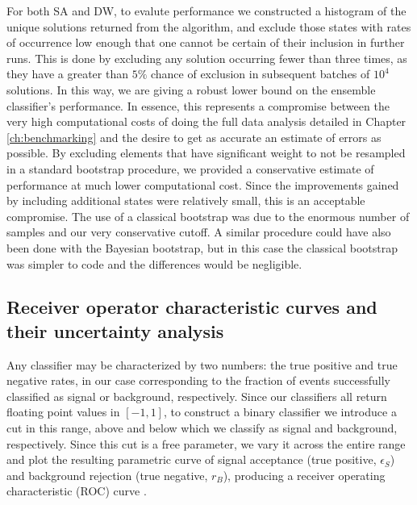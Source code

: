 For both SA and DW, to evalute performance we constructed a histogram of the unique solutions returned from the algorithm, and exclude those states with rates of occurrence low enough that one cannot be certain of their inclusion in further runs. This is done by excluding any solution occurring fewer than three times, as they have a greater than $5\%$ chance of exclusion in subsequent batches of $10^4$ solutions. In this way, we are giving a robust lower bound on the ensemble classifier's performance. In essence, this  represents a compromise between the very high computational costs of doing the full data analysis detailed in Chapter \ref{ch:benchmarking} and the desire to get as accurate an estimate of errors as possible. By excluding elements that have significant weight to not be resampled in a standard bootstrap procedure, we provided a conservative estimate of performance at much lower computational cost. Since the improvements gained by including additional states were relatively small, this is an acceptable compromise. The use of a classical bootstrap was due to the enormous number of samples and our very conservative cutoff. A similar procedure could have also been done with the Bayesian bootstrap, but in this case the classical bootstrap was simpler to code and the differences would be negligible.

\subsection{Receiver operator characteristic curves and their uncertainty analysis}
Any classifier may be characterized by two numbers: the true positive and true negative rates, in our case corresponding to the fraction of events successfully classified as signal or background, respectively. Since our classifiers all return floating point values in $[-1,1]$, to construct a binary classifier we introduce a cut in this range, above and below which we classify as signal and background, respectively. Since this cut is a free parameter, we vary it across the entire range and plot the resulting parametric curve of signal acceptance (true positive, $\epsilon_S$) and background rejection (true negative, $r_B$), producing a receiver operating characteristic (ROC) curve \cite{Hanley:1982}.

